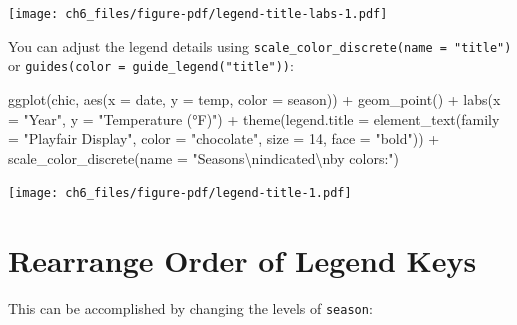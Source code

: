 \documentclass[
  letterpaper,
]{scrbook}
\newenvironment{Shaded}{\begin{snugshade}}{\end{snugshade}}
\newcommand{\AttributeTok}[1]{\textcolor[rgb]{0.40,0.45,0.13}{#1}}
\newcommand{\DecValTok}[1]{\textcolor[rgb]{0.68,0.00,0.00}{#1}}
\newcommand{\FunctionTok}[1]{\textcolor[rgb]{0.28,0.35,0.67}{#1}}
\newcommand{\NormalTok}[1]{\textcolor[rgb]{0.00,0.23,0.31}{#1}}
\newcommand{\OtherTok}[1]{\textcolor[rgb]{0.00,0.23,0.31}{#1}}
\newcommand{\SpecialCharTok}[1]{\textcolor[rgb]{0.37,0.37,0.37}{#1}}
\newcommand{\StringTok}[1]{\textcolor[rgb]{0.13,0.47,0.30}{#1}}
\begin{document}
\texttt{[image: ch6\_files/figure-pdf/legend-title-labs-1.pdf]}

You can adjust the legend details using
\texttt{scale\_color\_discrete(name\ =\ "title")} or
\texttt{guides(color\ =\ guide\_legend("title"))}:

\begin{Shaded}
\begin{Highlighting}[]
\FunctionTok{ggplot}\NormalTok{(chic, }\FunctionTok{aes}\NormalTok{(}\AttributeTok{x =}\NormalTok{ date, }\AttributeTok{y =}\NormalTok{ temp, }\AttributeTok{color =}\NormalTok{ season)) }\SpecialCharTok{+}
  \FunctionTok{geom\_point}\NormalTok{() }\SpecialCharTok{+}
  \FunctionTok{labs}\NormalTok{(}\AttributeTok{x =} \StringTok{"Year"}\NormalTok{, }\AttributeTok{y =} \StringTok{"Temperature (°F)"}\NormalTok{) }\SpecialCharTok{+}
  \FunctionTok{theme}\NormalTok{(}\AttributeTok{legend.title =} \FunctionTok{element\_text}\NormalTok{(}\AttributeTok{family =} \StringTok{"Playfair Display"}\NormalTok{,}
                                    \AttributeTok{color =} \StringTok{"chocolate"}\NormalTok{,}
                                    \AttributeTok{size =} \DecValTok{14}\NormalTok{, }\AttributeTok{face =} \StringTok{"bold"}\NormalTok{)) }\SpecialCharTok{+}
  \FunctionTok{scale\_color\_discrete}\NormalTok{(}\AttributeTok{name =} \StringTok{"Seasons}\SpecialCharTok{\textbackslash{}n}\StringTok{indicated}\SpecialCharTok{\textbackslash{}n}\StringTok{by colors:"}\NormalTok{)}
\end{Highlighting}
\end{Shaded}

\texttt{[image: ch6\_files/figure-pdf/legend-title-1.pdf]}

\section{Rearrange Order of Legend
Keys}\label{rearrange-order-of-legend-keys}

This can be accomplished by changing the levels of \texttt{season}:

\begin{Shaded}
\end{Shaded}
\end{document}
